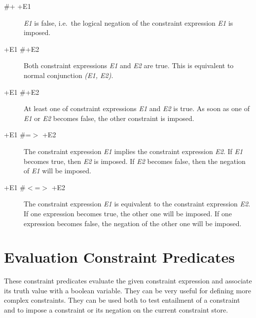 \begin{description}

\item[\#\bsl+ +E1]
{\it E1} is false, i.e.\ the logical negation of the constraint
expression {\it E1} is imposed.

\item[+E1 \#\andsy +E2]
Both constraint expressions {\it E1} and {\it E2} are true.
This is equivalent to normal conjunction {\it (E1, E2)}.

\item[+E1 \#\orsy +E2]
At least one of constraint expressions {\it E1} and {\it E2} is true.
As soon as one of {\it E1} or {\it E2} becomes false, the other constraint
is imposed.

\item[+E1 \#=$>$ +E2]
The constraint expression {\it E1} implies the
constraint expression {\it E2}.
If {\it E1} becomes true, then {\it E2} is imposed.
If {\it E2} becomes false, then the negation of {\it E1}
will be imposed.

\item[+E1 \#$<$=$>$ +E2]
The constraint expression {\it E1} is equivalent to the
constraint expression {\it E2}.
If one expression becomes true, the other one will be imposed.
If one expression becomes false, the negation of the other one will be imposed.
\end{description}

\section{Evaluation Constraint Predicates}
These constraint predicates evaluate the given constraint expression
and associate its truth value with a boolean variable.
They can be very useful for defining more complex constraints.
They can be used both to test entailment of a constraint
and to impose a constraint or its negation on the current constraint store.

